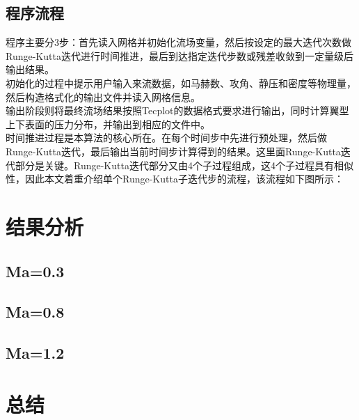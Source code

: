 \documentclass[UTF8]{ctexart}
\begin{document}
\subsection{程序流程}
程序主要分3步：首先读入网格并初始化流场变量，然后按设定的最大迭代次数做Runge-Kutta迭代进行时间推进，最后到达指定迭代步数或残差收敛到一定量级后输出结果。\\
\indent 初始化的过程中提示用户输入来流数据，如马赫数、攻角、静压和密度等物理量，然后构造格式化的输出文件并读入网格信息。\\
\indent 输出阶段则将最终流场结果按照Tecplot的数据格式要求进行输出，同时计算翼型上下表面的压力分布，并输出到相应的文件中。\\
\indent 时间推进过程是本算法的核心所在。在每个时间步中先进行预处理，然后做Runge-Kutta迭代，最后输出当前时间步计算得到的结果。这里面Runge-Kutta迭代部分是关键。Runge-Kutta迭代部分又由4个子过程组成，这4个子过程具有相似性，因此本文着重介绍单个Runge-Kutta子迭代步的流程，该流程如下图所示：


\section{结果分析}

\subsection{Ma=0.3}

\subsection{Ma=0.8}

\subsection{Ma=1.2}

\section{总结}
\end{document}
